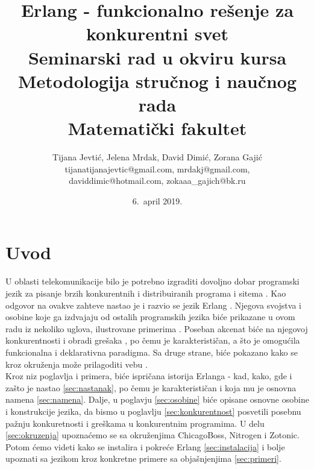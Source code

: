 \documentclass[a4paper]{article}
\begin{document}
\title{Erlang - funkcionalno rešenje za konkurentni svet\\ \small{Seminarski rad u okviru kursa\\Metodologija stručnog i naučnog rada\\ Matematički fakultet}}

\author{Tijana Jevtić, Jelena Mrdak, David Dimić, Zorana Gajić\\
tijanatijanajevtic@gmail.com, mrdakj@gmail.com,\\daviddimic@hotmail.com, zokaaa\_gajich@bk.ru}
\date{6.~april 2019.}
\maketitle



\setcounter{tocdepth}{1} 
\tableofcontents

\newpage

\section{Uvod}
\label{sec:uvod} 
U oblasti telekomunikacije bilo je potrebno izgraditi dovoljno 
dobar programski jezik za pisanje brzih konkurentnih i distribuiranih programa i sitema \cite{book_joe}. 
Kao odgovor na ovakve zahteve nastao je i razvio se jezik Erlang \cite{phdthesis}.
Njegova svojstva i osobine koje ga izdvajaju od ostalih programskih jezika
biće prikazane u ovom radu iz nekoliko uglova, ilustrovane primerima \cite{book_fred, book_joe}.
Poseban akcenat biće na njegovoj konkurentnosti i obradi grešaka \cite{book_concurrent},
po čemu je karakterističan, a što je omogućila funkcionalna i deklarativna paradigma. Sa druge strane, biće pokazano kako se kroz okruženja može prilagoditi vebu \cite{ChicagoBossDocumentation, DjangoTempDoc, ZotonicDocumentation}.\\

Kroz niz poglavlja i primera, biće ispričana istorija Erlanga - kad, kako, gde i zašto je nastao \ref{sec:nastanak}, 
po čemu je karakterističan i koja mu je osnovna namena \ref{sec:namena}. 
Dalje, u poglavju \ref{sec:osobine} biće opisane osnovne osobine i konstrukcije jezika, da bismo u poglavlju \ref{sec:konkurentnost} posvetili posebnu pažnju konkuretnosti i greškama u konkurentnim programima. 
U delu \ref{sec:okruzenja} upoznaćemo se sa okruženjima ChicagoBoss, Nitrogen i Zotonic. Potom ćemo videti kako se instalira i pokreće Erlang \ref{sec:instalacija}
i bolje upoznati sa jezikom kroz konkretne primere sa objašnjenjima \ref{sec:primeri}.
\end{document}
